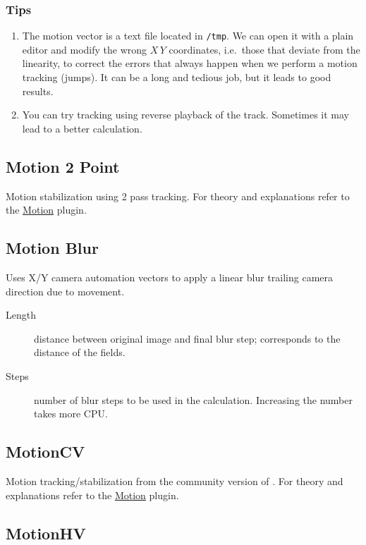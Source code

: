 \subsubsection*{Tips}
\label{ssub:tips}

\begin{enumerate}
    \item The motion vector is a text file located in \texttt{/tmp}. We can open it with a plain editor and modify the wrong $X\,Y$ coordinates, i.e.\ those that deviate from the linearity, to correct the errors that always happen when we perform a motion tracking (jumps). It can be a long and tedious job, but it leads to good results.
    \item You can try tracking using reverse playback of the track. Sometimes it may lead to a better calculation.
\end{enumerate}

\subsection{Motion 2 Point}%
\label{sub:motion_2_point}

Motion stabilization using 2 pass tracking. For theory and explanations refer to the \hyperref[sub:motion]{Motion} plugin.

\subsection{Motion Blur}%
\label{sub:motion_blur}

Uses X/Y camera automation vectors to apply a linear blur trailing camera direction due to movement.
\begin{description}
    \item[Length] distance between original image and final blur step; corresponds to the distance of the fields.
    \item[Steps] number of blur steps to be used in the calculation. Increasing the number takes more CPU.
\end{description}

\subsection{MotionCV}%
\label{sub:motioncv}

Motion tracking/stabilization from the community version of \CGG{}. For theory and explanations refer to the \hyperref[sub:motion]{Motion} plugin.

\subsection{MotionHV}%
\label{sub:motionhv}

